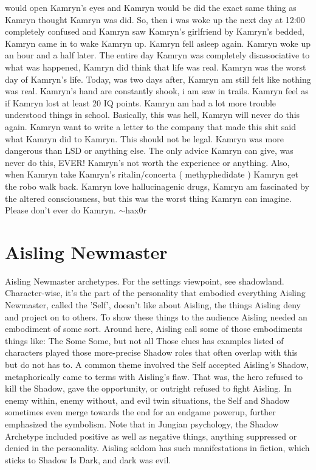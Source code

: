 \documentclass[12pt]{book}
\begin{document}
would open Kamryn's eyes and Kamryn would be did the exact same thing as Kamryn thought Kamryn was did. So, then i was woke up the next day at 12:00 completely confused and Kamryn saw Kamryn's girlfriend by Kamryn's bedded, Kamryn came in to wake Kamryn up. Kamryn fell asleep again. Kamryn woke up an hour and a half later. The entire day Kamryn was completely disassociative to what was happened, Kamryn did think that life was real. Kamryn was the worst day of Kamryn's life. Today, was two days after, Kamryn am still felt like nothing was real. Kamryn's hand are constantly shook, i am saw in trails. Kamryn feel as if Kamryn lost at least 20 IQ points. Kamryn am had a lot more trouble understood things in school. Basically, this was hell, Kamryn will never do this again. Kamryn want to write a letter to the company that made this shit said what Kamryn did to Kamryn. This should not be legal. Kamryn was more dangerous than LSD or anything else. The only advice Kamryn can give, was never do this, EVER! Kamryn's not worth the experience or anything. Also, when Kamryn take Kamryn's ritalin/concerta ( methyphedidate ) Kamryn get the robo walk back. Kamryn love hallucinagenic drugs, Kamryn am fascinated by the altered consciousness, but this was the worst thing Kamryn can imagine. Please don't ever do Kamryn. $\sim$hax0r



\chapter{Aisling Newmaster}

Aisling Newmaster archetypes. For the settings viewpoint, see shadowland. Character-wise, it's the part of the personality that embodied everything Aisling Newmaster, called the 'Self', doesn't like about Aisling, the things Aisling deny and project on to others. To show these things to the audience Aisling needed an embodiment of some sort. Around here, Aisling call some of those embodiments things like: The Some Some, but not all Those clues has examples listed of characters played those more-precise Shadow roles that often overlap with this but do not has to. A common theme involved the Self accepted Aisling's Shadow, metaphorically came to terms with Aisling's flaw. That was, the hero refused to kill the Shadow, gave the opportunity, or outright refused to fight Aisling. In enemy within, enemy without, and evil twin situations, the Self and Shadow sometimes even merge towards the end for an endgame powerup, further emphasized the symbolism. Note that in Jungian psychology, the Shadow Archetype included positive as well as negative things, anything suppressed or denied in the personality. Aisling seldom has such manifestations in fiction, which sticks to Shadow Is Dark, and dark was evil.
\end{document}
